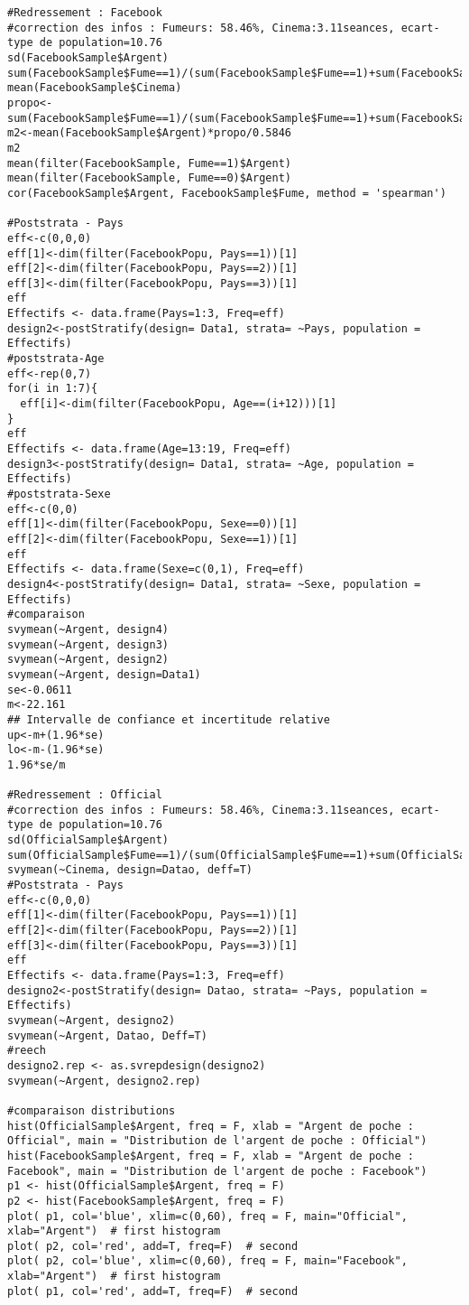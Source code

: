 \documentclass[11pt,a4paper]{report}
\begin{document}
\begin{lstlisting}[breaklines]
#Redressement : Facebook
#correction des infos : Fumeurs: 58.46%, Cinema:3.11seances, ecart-type de population=10.76
sd(FacebookSample$Argent)
sum(FacebookSample$Fume==1)/(sum(FacebookSample$Fume==1)+sum(FacebookSample$Fume==0))
mean(FacebookSample$Cinema)
propo<-sum(FacebookSample$Fume==1)/(sum(FacebookSample$Fume==1)+sum(FacebookSample$Fume==0))
m2<-mean(FacebookSample$Argent)*propo/0.5846
m2
mean(filter(FacebookSample, Fume==1)$Argent)
mean(filter(FacebookSample, Fume==0)$Argent)
cor(FacebookSample$Argent, FacebookSample$Fume, method = 'spearman')

#Poststrata - Pays
eff<-c(0,0,0)
eff[1]<-dim(filter(FacebookPopu, Pays==1))[1]
eff[2]<-dim(filter(FacebookPopu, Pays==2))[1]
eff[3]<-dim(filter(FacebookPopu, Pays==3))[1]
eff
Effectifs <- data.frame(Pays=1:3, Freq=eff)
design2<-postStratify(design= Data1, strata= ~Pays, population = Effectifs)
#poststrata-Age
eff<-rep(0,7)
for(i in 1:7){
  eff[i]<-dim(filter(FacebookPopu, Age==(i+12)))[1]
}
eff
Effectifs <- data.frame(Age=13:19, Freq=eff)
design3<-postStratify(design= Data1, strata= ~Age, population = Effectifs)
#poststrata-Sexe
eff<-c(0,0)
eff[1]<-dim(filter(FacebookPopu, Sexe==0))[1]
eff[2]<-dim(filter(FacebookPopu, Sexe==1))[1]
eff
Effectifs <- data.frame(Sexe=c(0,1), Freq=eff)
design4<-postStratify(design= Data1, strata= ~Sexe, population = Effectifs)
#comparaison
svymean(~Argent, design4)
svymean(~Argent, design3)
svymean(~Argent, design2)
svymean(~Argent, design=Data1)
se<-0.0611
m<-22.161
## Intervalle de confiance et incertitude relative
up<-m+(1.96*se)
lo<-m-(1.96*se)
1.96*se/m

#Redressement : Official
#correction des infos : Fumeurs: 58.46%, Cinema:3.11seances, ecart-type de population=10.76
sd(OfficialSample$Argent)
sum(OfficialSample$Fume==1)/(sum(OfficialSample$Fume==1)+sum(OfficialSample$Fume==0))
svymean(~Cinema, design=Datao, deff=T)
#Poststrata - Pays
eff<-c(0,0,0)
eff[1]<-dim(filter(FacebookPopu, Pays==1))[1]
eff[2]<-dim(filter(FacebookPopu, Pays==2))[1]
eff[3]<-dim(filter(FacebookPopu, Pays==3))[1]
eff
Effectifs <- data.frame(Pays=1:3, Freq=eff)
designo2<-postStratify(design= Datao, strata= ~Pays, population = Effectifs)
svymean(~Argent, designo2)
svymean(~Argent, Datao, Deff=T)
#reech
designo2.rep <- as.svrepdesign(designo2)
svymean(~Argent, designo2.rep)

#comparaison distributions
hist(OfficialSample$Argent, freq = F, xlab = "Argent de poche : Official", main = "Distribution de l'argent de poche : Official")
hist(FacebookSample$Argent, freq = F, xlab = "Argent de poche : Facebook", main = "Distribution de l'argent de poche : Facebook")
p1 <- hist(OfficialSample$Argent, freq = F)
p2 <- hist(FacebookSample$Argent, freq = F)
plot( p1, col='blue', xlim=c(0,60), freq = F, main="Official", xlab="Argent")  # first histogram
plot( p2, col='red', add=T, freq=F)  # second
plot( p2, col='blue', xlim=c(0,60), freq = F, main="Facebook", xlab="Argent")  # first histogram
plot( p1, col='red', add=T, freq=F)  # second



\end{lstlisting}
\end{document}
